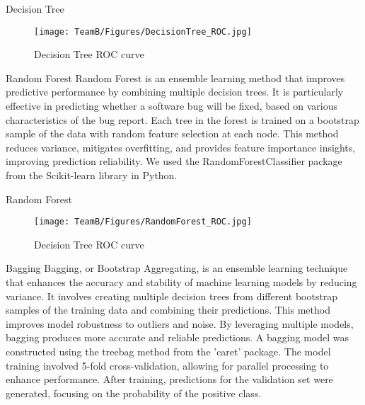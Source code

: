 \documentclass[10pt]{beamer}
\begin{document}
\begin{frame}[t]{Decision Tree}\justifying \vspace{1pt}
	\begin{figure}[htp]
		\centering
		\texttt{[image: TeamB/Figures/DecisionTree\_ROC.jpg]}
		\caption{Decision Tree ROC curve}
		\label{fig:picture1}
	\end{figure}
\end{frame}


\begin{frame}[t]{Random Forest}\justifying \vspace{10pt}
	Random Forest is an ensemble learning method that improves predictive performance by combining multiple decision trees. It is particularly effective in predicting whether a software bug will be fixed, based on various characteristics of the bug report. Each tree in the forest is trained on a bootstrap sample of the data with random feature selection at each node. This method reduces variance, mitigates overfitting, and provides feature importance insights, improving prediction reliability.
	\vskip 8pt
	We used the RandomForestClassifier package from the Scikit-learn library in Python.
\end{frame}


\begin{frame}[t]{Random Forest}\justifying \vspace{1pt}
	\begin{figure}[htp]
		\centering
		\texttt{[image: TeamB/Figures/RandomForest\_ROC.jpg]}
		\caption{Decision Tree ROC curve}
		\label{fig:picture1}
	\end{figure}
\end{frame}
 
 
\begin{frame}[t]{Bagging}\justifying \vspace{10pt}
	Bagging, or Bootstrap Aggregating, is an ensemble learning technique that enhances the accuracy and stability of machine learning models by reducing variance. It involves creating multiple decision trees from different bootstrap samples of the training data and combining their predictions. This method improves model robustness to outliers and noise. By leveraging multiple models, bagging produces more accurate and reliable predictions.
	\vskip 8pt
	A bagging model was constructed using the treebag method from the 'caret' package. The model training involved 5-fold cross-validation, allowing for parallel processing to enhance performance. After training, predictions for the validation set were generated, focusing on the probability of the positive class. 
\end{frame}
\end{document}
